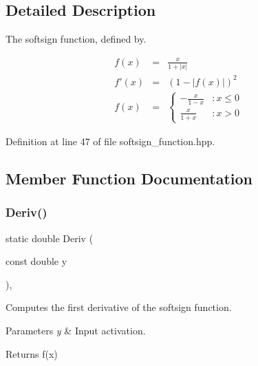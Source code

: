 \subsection{Detailed Description}
The softsign function, defined by. 

\begin{eqnarray*} f(x) &=& \frac{x}{1 + |x|} \\ f'(x) &=& (1 - |f(x)|)^2 \\ f(x) &=& \left\{ \begin{array}{lr} -\frac{x}{1 - x} & : x \le 0 \\ \frac{x}{1 + x} & : x > 0 \end{array} \right. \end{eqnarray*} 

Definition at line 47 of file softsign\+\_\+function.\+hpp.



\subsection{Member Function Documentation}
\mbox{\label{classmlpack_1_1ann_1_1SoftsignFunction_a163d34fd09f8edf457164f5033c635cf}} 
\subsubsection{Deriv()\hspace{0.1cm}{\footnotesize\ttfamily [1/2]}}
{\footnotesize\ttfamily static double Deriv (\begin{DoxyParamCaption}\item[{const double}]{y }\end{DoxyParamCaption})\hspace{0.3cm}{\ttfamily [inline]}, {\ttfamily [static]}}



Computes the first derivative of the softsign function. 


\begin{DoxyParams}{Parameters}
{\em y} & Input activation. \\
\hline
\end{DoxyParams}
\begin{DoxyReturn}{Returns}
f\textquotesingle{}(x) 
\end{DoxyReturn}


